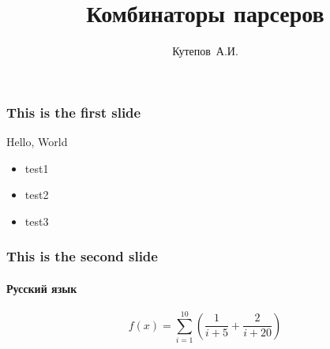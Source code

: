 \documentclass{beamer}
\title{Комбинаторы парсеров}
\author{Кутепов~А.И.}
\date{}
\begin{document}
  \frame{\titlepage}

  \begin{frame}
    \frametitle{This is the first slide}
    Hello, World
    \begin{itemize}
    \item test1
    \item test2
    \item test3
    \end{itemize}
  \end{frame}

  \begin{frame}
    \frametitle{This is the second slide}
    \framesubtitle{Русский язык}
    \begin{equation}
      f(x) = \sum_{i = 1}^{10} \left(\frac{1}{i + 5} + \frac{2}{i +
        20}\right)
    \end{equation}
  \end{frame}
\end{document}
